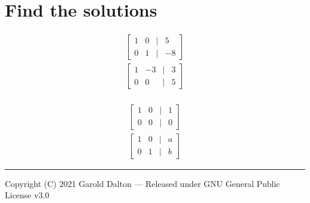 \documentclass[14pt]{extarticle}
\begin{document}
\section*{Find the solutions}
\begin{multicols}{2}
	\begin{align*}
		\begin{bmatrix}
			1 & 0 & | & 5 \\
			0 & 1 & | & -8
		\end{bmatrix}
	\end{align*}
	\begin{align*}
		\begin{bmatrix}
			1 & -3 & | & 3 \\
			0 & 0 & | & 5
		\end{bmatrix}
	\end{align*}
	\\
	\begin{align*}
		\begin{bmatrix}
			1 & 0 & | & 1 \\
			0 & 0 & | & 0
		\end{bmatrix}
	\end{align*}
	\begin{align*}
		\begin{bmatrix}
			1 & 0 & | & a \\
			0 & 1 & | & b
		\end{bmatrix}
	\end{align*}
\end{multicols}

\noindent\rule{\textwidth}{1pt}
{\footnotesize Copyright (C) 2021 Garold Dalton --- Released under GNU General Public License v3.0}
\end{document}

